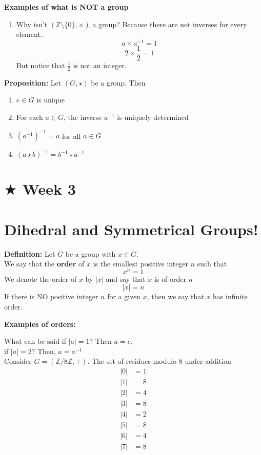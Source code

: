 \documentclass{article}
\begin{document}
\centerline{\textbf{Examples of what is NOT a group}}
\begin{enumerate}
    \item[] Why isn't \((\mathbb{Z}\setminus\{0\},\times)\) a group? Because there are not inverses for every element.
    \[a\times a^{-1}=1\]
    \[2 \times \frac{1}{2}=1\]
    But notice that \(\frac{1}{2}\) is not an integer.\\[1cm]

\end{enumerate}


\textbf{Proposition:} Let \((G, \star)\) be a group. Then
\begin{enumerate}
    \item \(e \in G\) is unique
    \item For each \(a \in G\), the inverse \(a^{-1}\) is uniquely determined
    \item \((a^{-1})^{-1}=a\) for all \(a \in G\)
    \item \((a \star b)^{-1}=b^{-1}\star a^{-1}\)
\end{enumerate}
\clearpage

\section*{$\bigstar$ Week 3}
\section*{Dihedral and Symmetrical Groups!}

\textbf{Definition:} Let \(G\) be a group with \(x \in G\).\\
We say that the \textbf{order} of \(x\) is the smallest positive integer \(n\) such that
\[x^n=1\]
We denote the order of \(x\) by \(|x|\) and say that \(x\) is of order \(n\)
\[|x|=n\]
If there is NO positive integer \(n\) for a given \(x\), then we say that \(x\) has infinite order.\\[0.5cm]

\centerline{\textbf{Examples of orders:}}
What can be said if \(|a|=1?\) Then \(a=e\),\\if \(|a|=2?\) Then, \(a=a^{-1}\)\\[0.3cm]

Consider \(G=(\mathbb{Z}/8\mathbb{Z}, +)\). The set of residues modulo 8 under addition
\begin{align*}
|0|&=1\\
|1|&=8\\
|2|&=4\\
|3|&=8\\
|4|&=2\\
|5|&=8\\
|6|&=4\\
|7|&=8\\
\end{align*}
\end{document}

